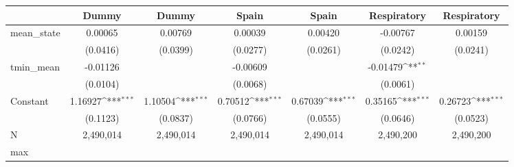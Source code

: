 {
\def\sym#1{\ifmmode^{#1}\else\(^{#1}\)\fi}
\begin{tabular}{l*{6}{c}}
\toprule
            &\multicolumn{1}{c}{Dummy}&\multicolumn{1}{c}{Dummy}&\multicolumn{1}{c}{Spain}&\multicolumn{1}{c}{Spain}&\multicolumn{1}{c}{Respiratory}&\multicolumn{1}{c}{Respiratory}\\
\midrule
mean\_state  &     0.00065         &     0.00769         &     0.00039         &     0.00420         &    -0.00767         &     0.00159         \\
            &    (0.0416)         &    (0.0399)         &    (0.0277)         &    (0.0261)         &    (0.0242)         &    (0.0241)         \\
tmin\_mean   &    -0.01126         &                     &    -0.00609         &                     &    -0.01479\sym{**} &                     \\
            &    (0.0104)         &                     &    (0.0068)         &                     &    (0.0061)         &                     \\
Constant    &     1.16927\sym{***}&     1.10504\sym{***}&     0.70512\sym{***}&     0.67039\sym{***}&     0.35165\sym{***}&     0.26723\sym{***}\\
            &    (0.1123)         &    (0.0837)         &    (0.0766)         &    (0.0555)         &    (0.0646)         &    (0.0523)         \\
\midrule
N           &   2,490,014         &   2,490,014         &   2,490,014         &   2,490,014         &   2,490,200         &   2,490,200         \\
max         &                     &                     &                     &                     &                     &                     \\
\bottomrule
\end{tabular}
}
